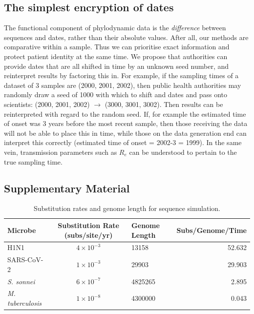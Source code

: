 \documentclass{article}
\begin{document}
\begin{spacing}{1.5}
\subsection*{The simplest encryption of dates}
The functional component of phylodynamic data is the \emph{difference} between sequences and dates, rather than their absolute values. After all, our methods are comparative within a sample. Thus we can prioritise exact information and protect patient identity at the same time. We propose that authorities can provide dates that are all shifted in time by an unknown seed number, and reinterpret results by factoring this in. For example, if the sampling times of a dataset of 3 samples are (2000, 2001, 2002), then public health authorities may randomly draw a seed of 1000 with which to shift and dates and pass onto scientists: (2000, 2001, 2002) $\rightarrow$ (3000, 3001, 3002). Then results can be reinterpreted with regard to the random seed. If, for example the estimated time of onset was 3 years before the most recent sample, then those receiving the data will not be able to place this in time, while those on the data generation end can interpret this correctly (estimated time of onset = 2002-3 = 1999). In the same vein, transmission parameters such as $R_e$ can be understood to pertain to the true sampling time.

\end{spacing}




\subsection*{Supplementary Material}

\renewcommand{\thefigure}{S\arabic{figure}}
\setcounter{figure}{0}

\begin{table}[h!]
    \centering
    \caption{Substitution rates and genome length for sequence simulation.}
    \begin{tabular}{l|c|l|r}
    \hline
    Microbe                     &   Substitution Rate (subs/site/yr) & Genome Length & Subs/Genome/Time  \\
    \hline
    H1N1                        & $4\times10^{-3}$ & 13158 & 52.632\\
    SARS-CoV-2                  & $1\times10^{-3}$ & 29903 & 29.903\\
    \textit{S. sonnei}    & $6\times10^{-7}$ & 4825265  & 2.895\\
    \textit{M. tuberculosis}    &   $1\times10^{-8}$ & 4300000 & 0.043\\
    \hline
    \end{tabular}
    \label{tab:seq_parms}
\end{table}
\end{document}
